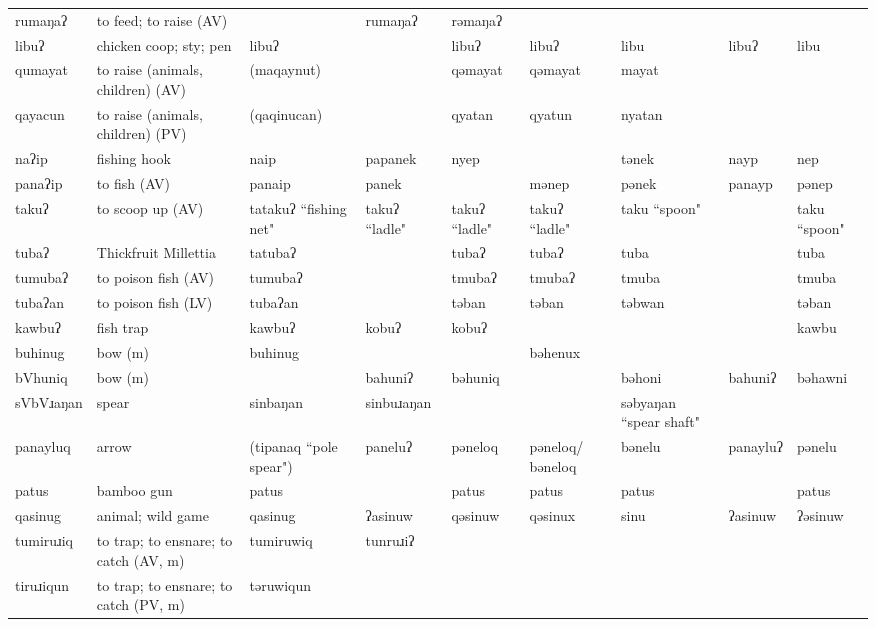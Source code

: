 \begin{landscape}
\begin{longtable}{*{9}{>{\raggedright\arraybackslash}p{}}}
\text{*}rumaŋaʔ & to feed; to raise (AV) &  & rumaŋaʔ & rəmaŋaʔ &  &  &  & \\
\text{*}libuʔ & chicken coop; sty; pen & libuʔ &  & libuʔ & libuʔ & libu & libuʔ & libu\\
\text{*}qumayat & to raise (animals, children) (AV) & (maqaynut) &  & qəmayat & qəmayat & mayat &  & \\
\text{*}qayacun & to raise (animals, children) (PV) & (qaqinucan) &  & qyatan & qyatun & nyatan &  & \\
\text{*}naʔip & fishing hook & naip & papanek & nyep &  & tənek & nayp & nep\\
\text{*}panaʔip & to fish (AV) & panaip & panek &  & mənep & pənek & panayp & pənep\\
\text{*}takuʔ & to scoop up (AV) & tatakuʔ \newline ``fishing net" & takuʔ ``ladle" & takuʔ ``ladle" & takuʔ ``ladle" & taku ``spoon" &  & taku ``spoon"\\
\text{*}tubaʔ & Thickfruit Millettia & tatubaʔ &  & tubaʔ & tubaʔ & tuba &  & tuba\\
\text{*}tumubaʔ & to poison fish (AV) & tumubaʔ &  & tmubaʔ & tmubaʔ & tmuba &  & tmuba\\
\text{*}tubaʔan & to poison fish (LV) & tubaʔan &  & təban & təban & təbwan &  & təban\\
\text{*}kawbuʔ & fish trap & kawbuʔ & kobuʔ & kobuʔ &  &  &  & kawbu\\
\text{*}buhinug & bow (m) & buhinug &  &  & bəhenux &  &  & \\
\text{*}bVhuniq & bow (m) &  & bahuniʔ & bəhuniq &  & bəhoni & bahuniʔ & bəhawni\\
\text{*}sVbVɹaŋan & spear & sinbaŋan & sinbuɹaŋan &  &  & səbyaŋan ``spear shaft" &  & \\
\text{*}panayluq & arrow & (tipanaq \newline ``pole spear") & paneluʔ & pəneloq & pəneloq/ \newline bəneloq & bənelu & panayluʔ & pənelu\\
\text{*}patus & bamboo gun & patus &  & patus & patus & patus &  & patus\\
\text{*}qasinug & animal; wild game & qasinug & ʔasinuw & qəsinuw & qəsinux & sinu & ʔasinuw & ʔəsinuw\\
\text{*}tumiruɹiq & to trap; to ensnare; to catch (AV, m) & tumiruwiq & tunruɹiʔ &  &  &  &  & \\
\text{*}tiruɹiqun & to trap; to ensnare; to catch (PV, m) & təruwiqun &  &  &  &  &  & \\

\end{longtable}
\end{landscape}
